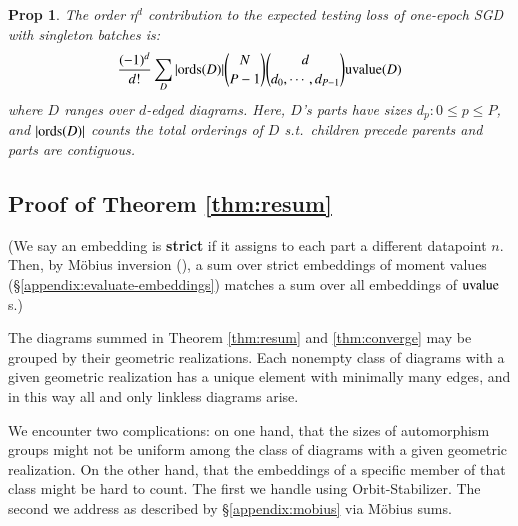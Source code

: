 \documentclass[anon,12pt]{colt2021} %
\newtheorem{prop}{Prop}
\newcommand{\uvalue}{\text{\textnormal{uvalue}}}
\newcommand{\ords}{\text{\textnormal{ords}}}
\begin{document}
{        \begin{prop} \label{prop:vanilla}
            The order $\eta^d$ contribution to the expected testing loss of
            one-epoch SGD with singleton batches is:
            \begin{equation*}\label{eq:sgdbasiccoef}
                \frac{(-1)^d}{d!} \sum_{D} 
                |\ords(D)| {N \choose P-1} {d \choose d_0,\cdots,d_{P-1}}
                \uvalue(D)
            \end{equation*}
            where $D$ ranges over $d$-edged diagrams.  Here, $D$'s parts have
            sizes $d_p: 0\leq p\leq P$, and $|\ords(D)|$ counts the total
            orderings of $D$ s.t.\ children precede parents and parts are
            contiguous.
        \end{prop}


    
    \subsection{Proof of Theorem \ref{thm:resum}}    \label{appendix:resum}

        (We say an embedding is \textbf{strict} if it assigns to each part
        a different datapoint $n$.
        Then, by M\"obius inversion (\cite{ro64}), a sum over strict embeddings
        of moment values (\S\ref{appendix:evaluate-embeddings}) matches 
        a sum over all embeddings of $\uvalue$s.)

        The diagrams summed in Theorem \ref{thm:resum} and \ref{thm:converge}
        may be grouped by their geometric realizations.  Each nonempty class of
        diagrams with a given geometric realization has a unique element with
        minimally many edges, and in this way all and only linkless diagrams
        arise. 

        We encounter two complications: on one hand, that the sizes of
        automorphism groups might not be uniform among the class of diagrams
        with a given geometric realization.  On the other hand, that the
        embeddings of a specific member of that class might be hard to count.
        The first we handle using Orbit-Stabilizer.  The second we address as
        described by \S\ref{appendix:mobius} via M\"obius sums.
           
}
\end{document}
